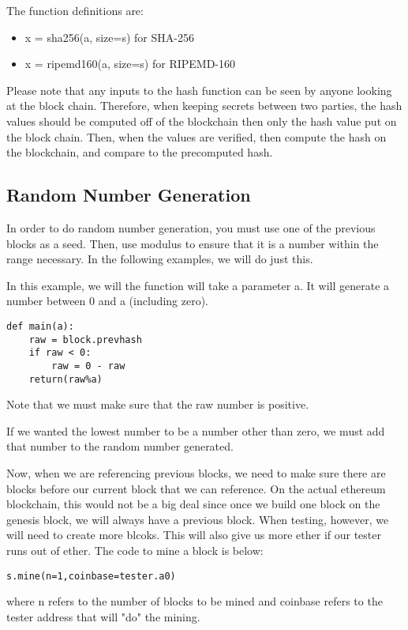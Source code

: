 \documentclass[12pt]{article}
\begin{document}
The function definitions are:
\begin{itemize}
	\item x = sha256(a, size=s) for SHA-256
	\item x = ripemd160(a, size=s) for RIPEMD-160
\end{itemize}

Please note that any inputs to the hash function can be seen by anyone looking at the block chain. Therefore, when keeping secrets between two parties, the hash values should be computed off of the blockchain then only the hash value put on the block chain. Then, when the values are verified, then compute the hash on the blockchain, and compare to the precomputed hash.

\subsection{Random Number Generation}
In order to do random number generation, you must use one of the previous blocks as a seed. Then, use modulus to ensure that it is a number within the range necessary. In the following examples, we will do just this.

In this example, we will the function will take a parameter a. It will generate a number between 0 and a (including zero).

\begin{lstlisting}
def main(a):
	raw = block.prevhash
	if raw < 0:
		raw = 0 - raw
	return(raw%a)
\end{lstlisting}

Note that we must make sure that the raw number is positive. \cite{PeterBorah 2014}

If we wanted the lowest number to be a number other than zero, we must add that number to the random number generated. 

Now, when we are referencing previous blocks, we need to make sure there are blocks before our current block that we can reference. On the actual ethereum blockchain, this would not be a big deal since once we build one block on the genesis block, we will always have a previous block. When testing, however, we will need to create more blcoks. This will also give us more ether if our tester runs out of ether. The code to mine a block is below:

\begin{lstlisting}
s.mine(n=1,coinbase=tester.a0)
\end{lstlisting}

where n refers to the number of blocks to be mined and coinbase refers to the tester address that will "do" the mining. \cite{Using pyethereum.tester}
\end{document}
